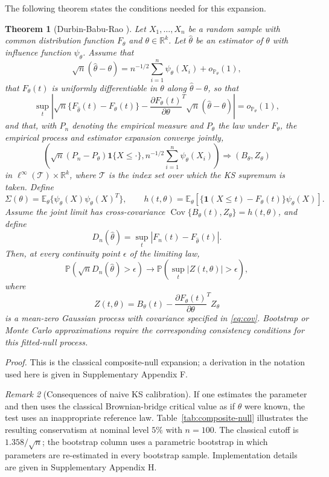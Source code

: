 \documentclass[preprint,12pt]{elsarticle}
\newcommand{\Cov}{\operatorname{Cov}}
\theoremstyle{plain}
\newtheorem{theorem}{Theorem}[section]
\theoremstyle{remark}
\newtheorem{remark}[theorem]{Remark}
\begin{document}
The following theorem states the conditions needed for this expansion.
\begin{theorem}[Durbin-Babu-Rao \citep{durbin1973weak,babu2004goodness}]
Let $X_1,\ldots,X_n$ be a random sample with common distribution function
$F_\theta$ and $\theta\in\mathbb{R}^k$. Let $\widehat{\theta}$ be an estimator
of $\theta$ with influence function $\psi_\theta$. Assume that
\[
\sqrt n(\widehat\theta-\theta)
=n^{-1/2}\sum_{i=1}^n\psi_\theta(X_i)+o_{\mathbb P_\theta}(1),
\]
that $F_\theta(t)$ is uniformly differentiable in $\theta$ along
$\widehat\theta-\theta$, so that
\[
\sup_t\left|
\sqrt n\{F_{\widehat\theta}(t)-F_\theta(t)\}
-\frac{\partial F_\theta(t)}{\partial\theta}^T
\sqrt n(\widehat\theta-\theta)
\right|=o_{\mathbb P_\theta}(1),
\]
and that, with $P_n$ denoting the empirical measure and $P_\theta$ the law
under $F_\theta$, the empirical process and estimator expansion converge
jointly,
\[
\left(\sqrt n(P_n-P_\theta)\mathbf 1\{X\le \cdot\},
n^{-1/2}\sum_{i=1}^n\psi_\theta(X_i)\right)
\Rightarrow (B_\theta,Z_\theta)
\]
in $\ell^\infty(\mathcal T)\times\mathbb R^k$, where $\mathcal T$ is the index
set over which the KS supremum is taken. Define
\[
\Sigma(\theta)=\mathbb E_\theta\{\psi_\theta(X)\psi_\theta(X)^T\},
\qquad
h(t,\theta)=\mathbb E_\theta[\{\mathbf 1(X\le t)-F_\theta(t)\}\psi_\theta(X)].
\]
Assume the joint limit has cross-covariance
$\Cov\{B_\theta(t),Z_\theta\}=h(t,\theta)$, and define
\[
D_n(\widehat{\theta})=\sup_{t}|F_n(t)-F_{\widehat{\theta}}(t)|.
\]
Then, at every continuity point $\epsilon$ of the limiting law,
\[
\mathbb{P}\left(\sqrt{n}D_n(\widehat{\theta})>\epsilon\right)
\longrightarrow
\mathbb{P}\left(\sup_t|Z(t,\theta)|>\epsilon\right),
\]
where
\[
Z(t,\theta)=B_\theta(t)
-\frac{\partial F_\theta(t)}{\partial\theta}^T Z_\theta
\]
is a mean-zero Gaussian process with covariance specified in \eqref{eq:cov}.
Bootstrap or Monte Carlo approximations require the corresponding consistency
conditions for this fitted-null process.
\end{theorem}

\noindent\textit{Proof.} This is the classical composite-null expansion; a
derivation in the notation used here is given in Supplementary Appendix F.

\begin{remark}[Consequences of naive KS calibration]
If one estimates the parameter and then
uses the classical Brownian-bridge critical value as if $\theta$ were known, the
test uses an inappropriate reference law. Table~\ref{tab:composite-null}
illustrates the resulting conservatism at nominal level $5\%$ with $n=100$.
The classical cutoff is
$1.358/\sqrt{n}$; the bootstrap column uses a parametric bootstrap in which
parameters are re-estimated in every bootstrap sample. Implementation details
are given in Supplementary Appendix H.
\end{remark}
\end{document}
